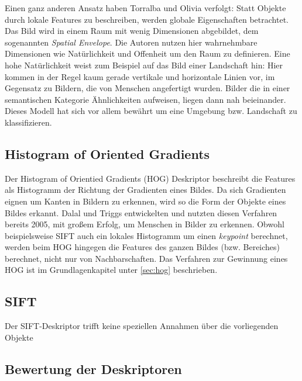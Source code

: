 Einen ganz anderen Ansatz haben Torralba und Olivia \cite{mts2001} verfolgt: Statt Objekte durch lokale Features zu beschreiben, werden globale Eigenschaften betrachtet. Das Bild wird in einem Raum mit wenig Dimensionen abgebildet, dem sogenannten \textit{Spatial Envelope}. Die Autoren nutzen hier wahrnehmbare Dimensionen wie Natürlichkeit und Offenheit um den Raum zu definieren. Eine hohe Natürlichkeit weist zum Beispiel auf das Bild einer Landschaft hin: Hier kommen in der Regel kaum gerade vertikale und horizontale Linien vor, im Gegensatz zu Bildern, die von Menschen angefertigt wurden.  Bilder die in einer semantischen Kategorie Ähnlichkeiten aufweisen, liegen dann nah beieinander. Dieses Modell hat sich vor allem bewährt um eine Umgebung bzw. Landschaft zu klassifizieren. 

\subsection{Histogram of Oriented Gradients}

Der Histogram of Orientied Gradients (HOG) Deskriptor beschreibt die Features als Histogramm der Richtung der Gradienten eines Bildes. Da sich Gradienten eignen um Kanten in Bildern zu erkennen, wird so die Form der Objekte eines Bildes erkannt. Dalal und Triggs \cite{hog2005} entwickelten und nutzten diesen Verfahren bereits 2005, mit großem Erfolg, um Menschen in Bilder zu erkennen. Obwohl beispielsweise SIFT auch ein lokales Histogramm um einen \textit{keypoint} berechnet, werden beim HOG hingegen die Features des ganzen Bildes (bzw. Bereiches) berechnet, nicht nur von Nachbarschaften. Das Verfahren zur Gewinnung eines HOG ist im Grundlagenkapitel unter \ref{sec:hog} beschrieben. 

\subsection{SIFT}

Der SIFT-Deskriptor trifft keine speziellen Annahmen über die vorliegenden Objekte

\subsection{Bewertung der Deskriptoren}

